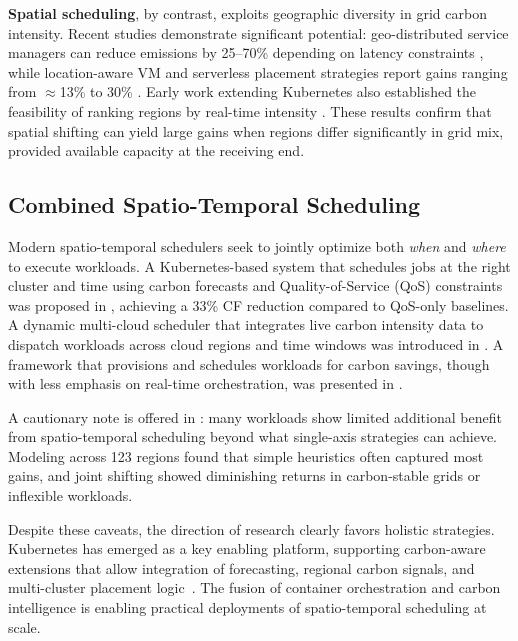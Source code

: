 \documentclass[10pt,journal,compsoc]{IEEEtran}
\begin{document}
\textbf{Spatial scheduling}, by contrast, exploits geographic diversity in grid carbon intensity. Recent studies demonstrate significant potential: geo-distributed service managers can reduce emissions by 25--70\% depending on latency constraints \cite{souza2024}, while location-aware VM and serverless placement strategies report gains ranging from $\approx$13\% to 30\% \cite{chadha2024, rawas2022}. Early work extending Kubernetes also established the feasibility of ranking regions by real-time intensity \cite{james2019}. These results confirm that spatial shifting can yield large gains when regions differ significantly in grid mix, provided available capacity at the receiving end.

\subsection{Combined Spatio-Temporal Scheduling}

Modern spatio-temporal schedulers seek to jointly optimize both \textit{when} and \textit{where} to execute workloads. A Kubernetes-based system that schedules jobs at the right cluster and time using carbon forecasts and Quality-of-Service (QoS) constraints was proposed in \cite{bahreini2024}, achieving a 33\% CF reduction compared to QoS-only baselines. A dynamic multi-cloud scheduler that integrates live carbon intensity data to dispatch workloads across cloud regions and time windows was introduced in \cite{beena2025}. A framework that provisions and schedules workloads for carbon savings, though with less emphasis on real-time orchestration, was presented in \cite{hanafy2025}.

A cautionary note is offered in \cite{sukprasert2024}: many workloads show limited additional benefit from spatio-temporal scheduling beyond what single-axis strategies can achieve. Modeling across 123 regions found that simple heuristics often captured most gains, and joint shifting showed diminishing returns in carbon-stable grids or inflexible workloads.

Despite these caveats, the direction of research clearly favors holistic strategies. Kubernetes has emerged as a key enabling platform, supporting carbon-aware extensions that allow integration of forecasting, regional carbon signals, and multi-cluster placement logic~\cite{asadov2025, bahreini2024}. The fusion of container orchestration and carbon intelligence is enabling practical deployments of spatio-temporal scheduling at scale.
\end{document}
